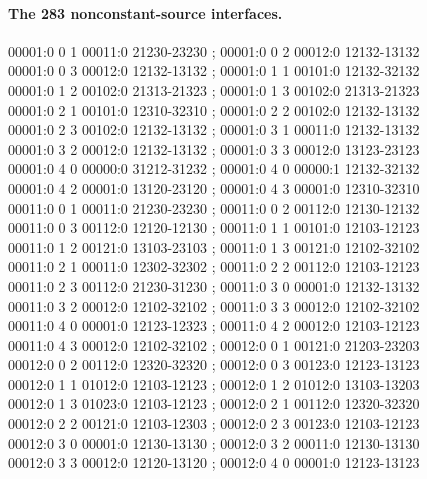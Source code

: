 \documentclass[11pt]{article}
\theoremstyle{remark}
\numberwithin{equation}{section}
\numberwithin{table}{section}
\begin{document}
\paragraph{The 283 nonconstant-source interfaces.}
\begingroup\scriptsize\ttfamily\begin{flushleft}
00001:0 0 1 00011:0 21230-23230 ; 00001:0 0 2 00012:0 12132-13132\\
00001:0 0 3 00012:0 12132-13132 ; 00001:0 1 1 00101:0 12132-32132\\
00001:0 1 2 00102:0 21313-21323 ; 00001:0 1 3 00102:0 21313-21323\\
00001:0 2 1 00101:0 12310-32310 ; 00001:0 2 2 00102:0 12132-13132\\
00001:0 2 3 00102:0 12132-13132 ; 00001:0 3 1 00011:0 12132-13132\\
00001:0 3 2 00012:0 12132-13132 ; 00001:0 3 3 00012:0 13123-23123\\
00001:0 4 0 00000:0 31212-31232 ; 00001:0 4 0 00000:1 12132-32132\\
00001:0 4 2 00001:0 13120-23120 ; 00001:0 4 3 00001:0 12310-32310\\
00011:0 0 1 00011:0 21230-23230 ; 00011:0 0 2 00112:0 12130-12132\\
00011:0 0 3 00112:0 12120-12130 ; 00011:0 1 1 00101:0 12103-12123\\
00011:0 1 2 00121:0 13103-23103 ; 00011:0 1 3 00121:0 12102-32102\\
00011:0 2 1 00011:0 12302-32302 ; 00011:0 2 2 00112:0 12103-12123\\
00011:0 2 3 00112:0 21230-31230 ; 00011:0 3 0 00001:0 12132-13132\\
00011:0 3 2 00012:0 12102-32102 ; 00011:0 3 3 00012:0 12102-32102\\
00011:0 4 0 00001:0 12123-12323 ; 00011:0 4 2 00012:0 12103-12123\\
00011:0 4 3 00012:0 12102-32102 ; 00012:0 0 1 00121:0 21203-23203\\
00012:0 0 2 00112:0 12320-32320 ; 00012:0 0 3 00123:0 12123-13123\\
00012:0 1 1 01012:0 12103-12123 ; 00012:0 1 2 01012:0 13103-13203\\
00012:0 1 3 01023:0 12103-12123 ; 00012:0 2 1 00112:0 12320-32320\\
00012:0 2 2 00121:0 12103-12303 ; 00012:0 2 3 00123:0 12103-12123\\
00012:0 3 0 00001:0 12130-13130 ; 00012:0 3 2 00011:0 12130-13130\\
00012:0 3 3 00012:0 12120-13120 ; 00012:0 4 0 00001:0 12123-13123\\

\end{flushleft}
\end{document}
